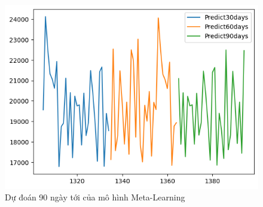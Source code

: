 \begin{figure}[H]
\begin{minipage}{0.15\textwidth}
    \includegraphics[width=1\textwidth]{resources/chapter-5/newdata1/predicted/EXB_ML_9_1_30days.png}
    \end{minipage}
    \hfill
    
    \caption{Dự đoán 90 ngày tới của mô hình Meta-Learning}
    \label{fig:lstm_predicted}
\end{figure}


